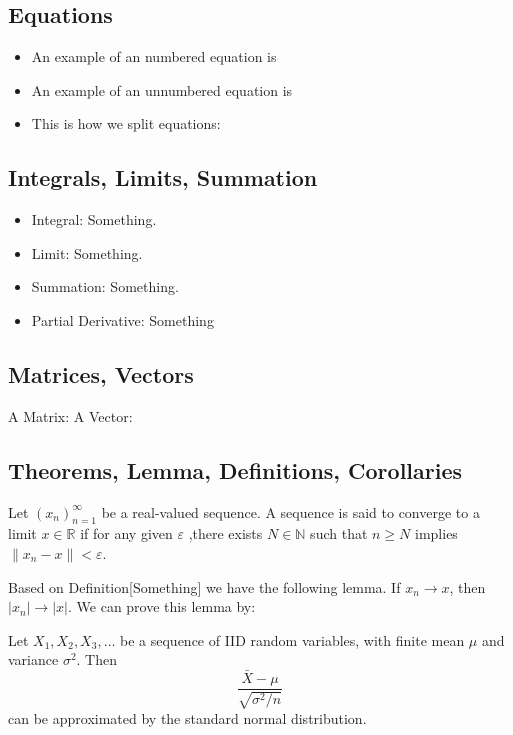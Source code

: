 \documentclass{article}
\begin{document}
		\subsection{Equations}
			\begin{itemize}
				\item An example of an numbered equation is
				\item An example of an unnumbered equation is
				\item This is how we split equations:
			\end{itemize}
		\subsection{Integrals, Limits, Summation}
			\begin{itemize}
				\item Integral: Something.
				\item Limit: Something.
				\item Summation: Something.
				\item Partial Derivative: Something
			\end{itemize}
			
		\subsection{Matrices, Vectors}
			A Matrix:
			A Vector:
			
		\subsection{Theorems, Lemma, Definitions, Corollaries}
				Let $(x_{n})_{n=1}^{\infty}$ be a real-valued sequence. A sequence is said to converge to a limit $x \in \mathbb{R}$ if for any given $\varepsilon$ ,there exists $N \in\mathbb{N}$ such that $n \geq N$ implies $\|x_{n}-x\|<\varepsilon$. 
			
			Based on Definition[Something] we have the following lemma.
			If $x_{n} \to x$, then $|x_{n}| \to |x|$.
			We can prove this lemma by:
			
			
			
			Let $X_{1}, X_{2}, X_{3}, \dots$ be a sequence of IID random variables, with finite mean $\mu$ and variance $\sigma^{2}$. Then
				\begin{equation}
					\frac{\bar{X}-\mu}{\sqrt{\sigma^{2}/n}}
				\end{equation}
				can be approximated by the standard normal distribution.
\end{document}
